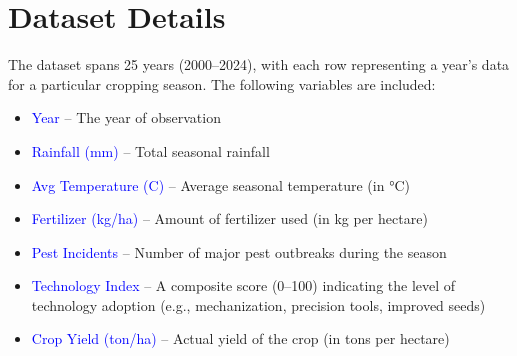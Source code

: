 \section{Dataset Details}

The dataset spans 25 years (2000–2024), with each row representing a year’s data for a particular cropping season. The following variables are included:
\begin{itemize}
    

\item  \textcolor{blue}{Year} – The year of observation
\item \textcolor{blue}{Rainfall (mm)} – Total seasonal rainfall
\item \textcolor{blue}{Avg Temperature (\degree C)} – Average seasonal temperature (in °C)
\item \textcolor{blue}{Fertilizer (kg/ha)} – Amount of fertilizer used (in kg per hectare)
\item \textcolor{blue}{Pest Incidents} – Number of major pest outbreaks during the season
\item \textcolor{blue}{Technology Index} – A composite score (0–100) indicating the level of technology adoption (e.g., mechanization, precision tools, improved seeds)
\item \textcolor{blue}{Crop Yield (ton/ha)} – Actual yield of the crop (in tons per hectare)

\end{itemize}
